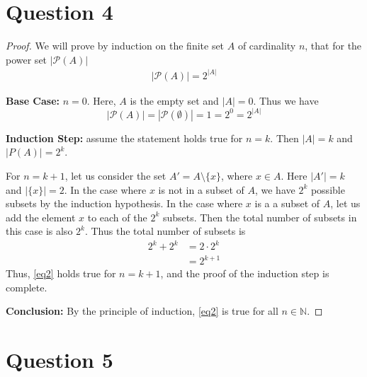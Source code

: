 \documentclass[11pt, oneside]{article}   	%
\begin{document}
\section*{Question 4}

\begin{proof} We will prove by induction on the finite set $A$ of cardinality $n$, that for the power set $|\mathcal{P}(A)|$
\begin{align}
	|\mathcal{P}(A)| = 2^{|A|}
\label{eq2}
\end{align}

\textbf{Base Case:} $n=0$. Here, $A$ is the empty set and $|A|=0$. Thus we have
$$|\mathcal{P}(A)| = |\mathcal{P}(\emptyset)| = 1 = 2^{0} = 2^{|A|}$$

\textbf{Induction Step:} assume the statement holds true for $n=k$. Then $|A|=k$ and $|P(A)| = 2^k$.

For $n=k+1$, let us consider the set $A' = A \setminus \{x\}$, where $x \in A$. Here $|A'| = k$ and $|\{x\}|=2$. In the case where $x$ is not in a subset of $A$, we have $2^k$ possible subsets by the induction hypothesis. In the case where $x$ is a a subset of $A$, let us add the element $x$ to each of the $2^k$ subsets. Then the total number of subsets in this case is also $2^k$. Thus the total number of subsets is
\begin{align*}
	2^k + 2^k & = 2 \cdot 2^k \\
	& = 2^{k+1}
\end{align*}
Thus, \eqref{eq2} holds true for $n=k+1$, and the proof of the induction step is complete.

\textbf{Conclusion:} By the principle of induction, \eqref{eq2} is true for all $n \in \mathbb{N}$.
\end{proof}


\section*{Question 5}
\end{document}
